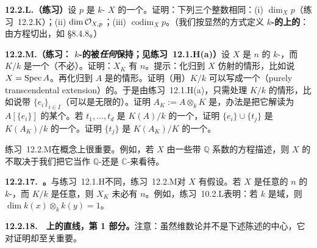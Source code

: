 \textbf{12.2.L.（练习）}\quad 设 $p$ 是\trLocally\trFiniteType{} $k$-\trScheme{} $X$ 的一个\trClosedPoint。证明：下列三个整数相同：(i) $\dim_X p$（\mbox{练习~12.2.K}）；(ii) $\dim\mathcal{O}_{X,p}$；(iii) $\operatorname{codim}_Xp$。（我们按显然的方式定义\textbf{\trFiniteType{} $k$-\trScheme{}的\trClosedPoint{}上的\trZariskiTopology}：\trClosedSubset{}由方程切出，如 \S8.4.8。）

\textbf{12.2.M.（练习：\trLocally\trFiniteType{} $k$-\trScheme{}的\trDimension{}被\emph{任何}\trFieldExtension{}保持；见\mbox{练习~12.1.H}(a)）}\quad 设 $X$ 是\trPureDimension{} $n$ 的\trLocally\trFiniteType{} $k$-\trScheme，而 $K/k$ 是一个\trFieldExtension{}（不必\trAlgebraic）。证明：$X_K$ 有\trPureDimension{} $n$。提示：化归到 $X$ 仿射的情形，比如说 $X=\operatorname{Spec} A$。再化归到 $A$ 是\trIntegralDomain{}的情形。证明（用\trAxiomOfChoice）$K/k$ 可以写成一个\trPurelyTranscendental\trExtension（purely transcendental extension）的\trAlgebraic\trFieldExtension。于是由\mbox{练习~12.1.H}(a)，只需处理 $K/k$ \trPurelyTranscendental{}的情形，比如说带\trTranscendenceBase{} $\{e_i\}_{i\in I}$（可以是无限的）。证明 $A_K:=A\otimes_k K$ 是\trIntegralDomain，办法是把它解读为\trIntegralDomain{} $A[\{e_i\}]$ 的某个\trLocalization。若 $t_1,\dots,t_d$ 是 $K(A)/k$ 的一个\trTranscendenceBase，证明 $\{e_i\}\cup\{t_j\}$ 是 $K(A_K)/k$ 的一个\trTranscendenceBase。证明 $\{t_j\}$ 是 $K(A_K)/K$ 的一个\trTranscendenceBase。

\mbox{练习~12.2.M}在概念上很重要。例如，若 $X$ 由一些带 $\mathbb{Q}$ 系数的方程描述，则 $X$ 的\trDimension{}不取决于我们把它当作 $\mathbb{Q}$-\trScheme{}还是 $\mathbb{C}$-\trScheme{}来看待。

\textbf{12.2.17.\ \trhRemark{}。}\quad 与\mbox{练习~12.1.H}不同，\mbox{练习~12.2.M}对 $X$ 有\trFiniteType{}假设。若 $X$ 是任意的\trPureDimension{} $n$ 的 $k$-\trScheme，而 $K/k$ 是任意\trExtension，则 $X_K$ 未必有\trPureDimension{} $n$。例如，\mbox{练习~10.2.L}表明：若 $k$ 是域，则 $\dim k(x)\otimes_k k(y)=1$。

\textbf{12.2.18.}\ \hard\ \textbf{\trHypersurface{}上的直线，第 1 部分。}\quad 注意：虽然维数论并不是下述陈述的中心，它对证明却至关重要。

